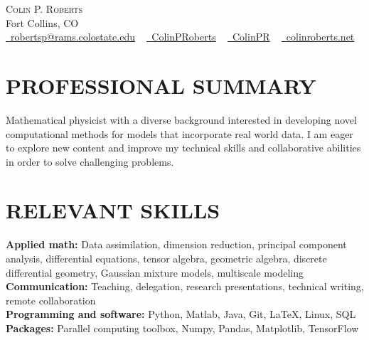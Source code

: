 \documentclass[letterpaper,11pt]{article}
\newcommand{\accentcolor}[1]{\textcolor{accentcolor}{#1}}
\begin{document}


\begin{center}
    {\Huge \scshape Colin P. Roberts} \\ \vspace{1pt}
    Fort Collins, CO \\ \vspace{1pt}
    \href{mailto:robertsp@rams.colostate.edu}{\faEnvelope \ \accentcolor{robertsp@rams.colostate.edu}} ~
    \href{https://www.linkedin.com/in/colinproberts/}{\faLinkedinSquare \ \accentcolor{ColinPRoberts}}  ~
    \href{https://github.com/ColinPR}{\faGithub \ \accentcolor{ColinPR}} ~
    \href{https://www.colinroberts.net}{\faGreaterThan \ \accentcolor{colinroberts.net}}
\end{center}

\vspace*{-10pt}
\section{PROFESSIONAL SUMMARY}

    Mathematical physicist with a diverse background interested in developing novel computational methods for models that incorporate real world data. I am eager to explore new content and improve my technical skills and collaborative abilities in order to solve challenging problems. 
 \vspace{-5pt}
\section{RELEVANT SKILLS}
 \begin{itemize}[leftmargin=0in, label={}]
    \small{\item{

     \textbf{\normalsize{Applied math:}}{ \normalsize{Data assimilation, dimension reduction, principal component analysis, differential equations, tensor algebra, geometric algebra, discrete differential geometry, Gaussian mixture models, multiscale modeling}} \\
     \textbf{\normalsize{Communication:}}{ \normalsize{Teaching, delegation, research presentations, technical writing, remote collaboration}} \\
     \textbf{\normalsize{Programming and software:}}{ \normalsize{Python, Matlab, Java, Git, \LaTeX, Linux, SQL}} \\
     \textbf{\normalsize{Packages:}}{ \normalsize{Parallel computing toolbox, Numpy, Pandas, Matplotlib, TensorFlow}} \\	
	}}
 \end{itemize}
 \vspace{-25pt}
\end{document}
